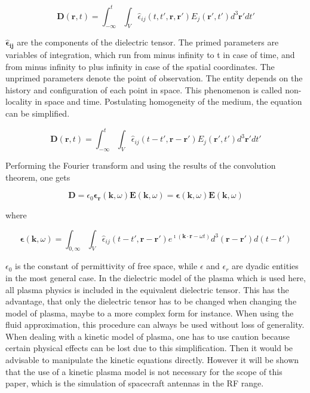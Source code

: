 \documentclass[a4paper,11pt]{article}
\begin{document}
\begin{equation}
    \mathbf{D}(\mathbf{r},t)=\int_{-\infty}^t\int_V\hat{\epsilon}_{ij}(t,t',\mathbf{r},\mathbf{r'}) E_j(\mathbf{r'},t')d^3\mathbf{r'}dt'
\end{equation}

$\mathbf{\hat{\epsilon}_{ij}}$ are the components of the dielectric tensor. The primed parameters are  variables of integration, which run from minus infinity to t in case of time, and from minus infinity to plus infinity in case of the spatial coordinates. The unprimed parameters denote the point of observation. The entity depends on the history and configuration of each point in space. This phenomenon is called non-locality in space and time. Postulating homogeneity of the medium, the equation can be simplified.

\begin{equation}
    \mathbf{D}(\mathbf{r},t)=\int_{-\infty}^t\int_V\hat{\epsilon}_{ij}(t-t',\mathbf{r}-\mathbf{r'}) E_j(\mathbf{r'},t')d^3\mathbf{r'}dt'
\end{equation}

Performing the Fourier transform and using the results of the convolution theorem, one gets

\begin{equation}
\mathbf{D} = \epsilon_0 \mathbf{\epsilon_r}(\mathbf{k},\omega) \mathbf{E}(\mathbf{k},\omega) = \mathbf{\epsilon}(\mathbf{k},\omega) \mathbf{E}(\mathbf{k},\omega)\label{constitutive_1_vacuum}
\end{equation}

where

\begin{equation}
    \mathbf{\epsilon}(\mathbf{k},\omega)=\int_{0,\infty}\int_V\hat{\epsilon}_{ij}(t-t',\mathbf{r}-\mathbf{r'}) e^{\imath (\mathbf{k}\cdot \mathbf{r}- \omega t)}d^3\mathbf{(r-r')}d(t-t')
\end{equation}

$\epsilon_0$ is the constant of permittivity of free space, while $\epsilon$ and $\epsilon_r$
are dyadic entities in the most general case. In the dielectric model of the plasma which is used here, all plasma physics is included in the equivalent dielectric tensor. This has the advantage, that only the dielectric tensor has to be changed when changing the model of plasma, maybe to a more complex form for instance. When using the fluid approximation, this procedure can always be used without loss of generality. When dealing with a kinetic model of plasma, one has to use caution because certain physical effects can be lost due to this simplification. Then it would be advisable to manipulate the kinetic equations directly. However it will be shown that the use of a kinetic plasma model is not necessary for the scope of this paper, which is the simulation of spacecraft antennas in the RF range.\\
\end{document}
